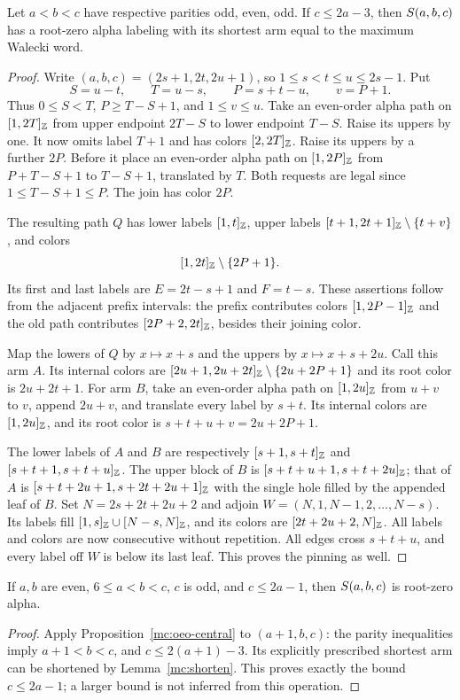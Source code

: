 \begin{proposition}\label{mc:oeo-central}
Let $a<b<c$ have respective parities odd, even, odd.  If
$c\le2a-3$, then $S\!\left(a,b,c\right)$ has a root-zero alpha labeling
with its shortest arm equal to the maximum Walecki word.
\end{proposition}
\begin{proof}
Write $(a,b,c)=(2s+1,2t,2u+1)$, so
$1\le s<t\le u\le2s-1$.  Put
\[
 S=u-t,\qquad T=u-s,\qquad P=s+t-u,\qquad v=P+1.
\]
Thus $0\le S<T$, $P\ge T-S+1$, and $1\le v\le u$.
Take an even-order alpha path on $[1,2T]_{\mathbb Z}$ from upper
endpoint $2T-S$ to lower endpoint $T-S$.  Raise its uppers by one.
It now omits label $T+1$ and has colors $[2,2T]_{\mathbb Z}$.
Raise its uppers by a further $2P$.  Before it place an even-order
alpha path on $[1,2P]_{\mathbb Z}$ from $P+T-S+1$ to $T-S+1$,
translated by $T$.  Both requests are legal since
$1\le T-S+1\le P$.  The join has color $2P$.

The resulting path $Q$ has lower labels $[1,t]_{\mathbb Z}$,
upper labels $[t+1,2t+1]_{\mathbb Z}\setminus\{t+v\}$, and colors
\[
 [1,2t]_{\mathbb Z}\setminus\{2P+1\}.
\]
Its first and last labels are $E=2t-s+1$ and $F=t-s$.
These assertions follow from the adjacent prefix intervals: the
prefix contributes colors $[1,2P-1]_{\mathbb Z}$ and the old path
contributes $[2P+2,2t]_{\mathbb Z}$, besides their joining color.

Map the lowers of $Q$ by $x\mapsto x+s$ and the uppers by
$x\mapsto x+s+2u$.  Call this arm $A$.  Its internal colors are
$[2u+1,2u+2t]_{\mathbb Z}\setminus\{2u+2P+1\}$ and its root
color is $2u+2t+1$.
For arm $B$, take an even-order alpha path on
$[1,2u]_{\mathbb Z}$ from $u+v$ to $v$, append $2u+v$, and
translate every label by $s+t$.  Its internal colors are
$[1,2u]_{\mathbb Z}$, and its root color is
$s+t+u+v=2u+2P+1$.

The lower labels of $A$ and $B$ are respectively
$[s+1,s+t]_{\mathbb Z}$ and $[s+t+1,s+t+u]_{\mathbb Z}$.
The upper block of $B$ is $[s+t+u+1,s+t+2u]_{\mathbb Z}$;
that of $A$ is $[s+t+2u+1,s+2t+2u+1]_{\mathbb Z}$ with the
single hole filled by the appended leaf of $B$.
Set $N=2s+2t+2u+2$ and adjoin
$W=(N,1,N-1,2,\ldots,N-s)$.  Its labels fill
$[1,s]_{\mathbb Z}\cup[N-s,N]_{\mathbb Z}$, and its colors are
$[2t+2u+2,N]_{\mathbb Z}$.  All labels and colors are now consecutive
without repetition.  All edges cross $s+t+u$, and every label off
$W$ is below its last leaf.  This proves the pinning as well.
\end{proof}

\begin{corollary}\label{mc:eeo-central}
If $a,b$ are even, $6\le a<b<c$, $c$ is odd, and
$c\le2a-1$, then $S\!\left(a,b,c\right)$ is root-zero alpha.
\end{corollary}
\begin{proof}
Apply Proposition~\ref{mc:oeo-central} to $(a+1,b,c)$:
the parity inequalities imply $a+1<b<c$, and
$c\le2(a+1)-3$.  Its explicitly prescribed shortest arm can be
shortened by Lemma~\ref{mc:shorten}.  This proves exactly the bound
$c\le2a-1$; a larger bound is not inferred from this operation.
\end{proof}

